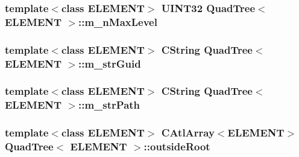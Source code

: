 \subsubsection[{m\+\_\+n\+Max\+Level}]{\setlength{\rightskip}{0pt plus 5cm}template$<$class E\+L\+E\+M\+E\+N\+T$>$ U\+I\+N\+T32 {\bf Quad\+Tree}$<$ E\+L\+E\+M\+E\+N\+T $>$\+::m\+\_\+n\+Max\+Level\hspace{0.3cm}{\ttfamily [protected]}}\label{class_quad_tree_ae6ef9f08260312e1d9c66e9d6c85a7cc}
\hypertarget{class_quad_tree_aa2442bd74f5a5e2fb98f7aefa7f6b266}{}
\subsubsection[{m\+\_\+str\+Guid}]{\setlength{\rightskip}{0pt plus 5cm}template$<$class E\+L\+E\+M\+E\+N\+T$>$ C\+String {\bf Quad\+Tree}$<$ E\+L\+E\+M\+E\+N\+T $>$\+::m\+\_\+str\+Guid\hspace{0.3cm}{\ttfamily [protected]}}\label{class_quad_tree_aa2442bd74f5a5e2fb98f7aefa7f6b266}
\hypertarget{class_quad_tree_af1472627552c542d278dc1b4b4649643}{}
\subsubsection[{m\+\_\+str\+Path}]{\setlength{\rightskip}{0pt plus 5cm}template$<$class E\+L\+E\+M\+E\+N\+T$>$ C\+String {\bf Quad\+Tree}$<$ E\+L\+E\+M\+E\+N\+T $>$\+::m\+\_\+str\+Path\hspace{0.3cm}{\ttfamily [protected]}}\label{class_quad_tree_af1472627552c542d278dc1b4b4649643}
\hypertarget{class_quad_tree_a810de5df1773133707e81a018832a88c}{}
\subsubsection[{outside\+Root}]{\setlength{\rightskip}{0pt plus 5cm}template$<$class E\+L\+E\+M\+E\+N\+T$>$ C\+Atl\+Array$<$E\+L\+E\+M\+E\+N\+T$>$ {\bf Quad\+Tree}$<$ E\+L\+E\+M\+E\+N\+T $>$\+::outside\+Root\hspace{0.3cm}{\ttfamily [protected]}}\label{class_quad_tree_a810de5df1773133707e81a018832a88c}
\hypertarget{class_quad_tree_a0d86bcbcea5607193be82bbd8621a34d}{}
